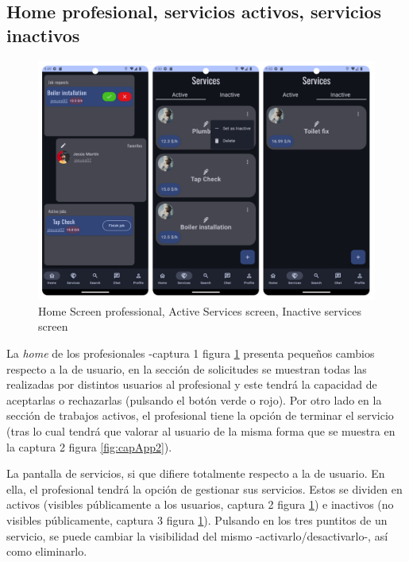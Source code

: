 \subsection{Home profesional, servicios activos, servicios inactivos}
\begin{figure}[h]
	\centering
	\includegraphics[width = 1\textwidth]{Imagenes/capturasApp/profHome_active_inactive.png}
	\caption{Home Screen professional, Active Services screen, Inactive services screen}
	\label{fig:capApp6}
\end{figure}
La \textit{home} de los profesionales -captura 1 figura \ref{fig:capApp6} presenta pequeños cambios respecto a la de usuario, en la sección de solicitudes se muestran todas las realizadas por distintos usuarios al profesional y este tendrá la capacidad de aceptarlas o rechazarlas (pulsando el botón verde o rojo). Por otro lado en la sección de trabajos activos, el profesional tiene la opción de terminar el servicio (tras lo cual tendrá que valorar al usuario de la misma forma que se muestra en la captura 2 figura \ref{fig:capApp2}).

La pantalla de servicios, si que difiere totalmente respecto a la de usuario. En ella, el profesional tendrá la opción de gestionar sus servicios. Estos se dividen en activos (visibles públicamente a los usuarios, captura 2 figura \ref{fig:capApp6}) e inactivos (no visibles públicamente, captura 3 figura \ref{fig:capApp6}). Pulsando en los tres puntitos de un servicio, se puede cambiar la visibilidad del mismo -activarlo/desactivarlo-, así como eliminarlo.

\newpage

